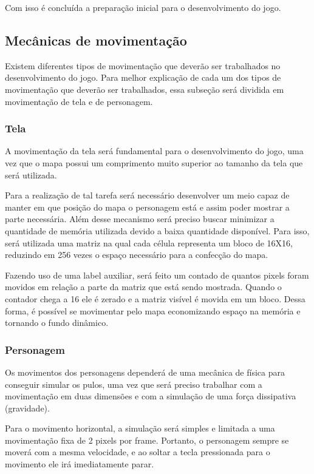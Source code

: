 \documentclass[11pt, twocolumn]{extarticle}
\begin{document}
Com isso é concluída a preparação inicial para o desenvolvimento do jogo.

\subsection{Mecânicas de movimentação}
\indent \indent Existem diferentes tipos de movimentação que deverão ser trabalhados no desenvolvimento do jogo. Para melhor explicação de cada um dos tipos de movimentação que deverão ser trabalhados, essa subseção será dividida em movimentação de tela e de personagem.

\subsubsection{Tela}
\indent \indent A movimentação da tela será fundamental para o desenvolvimento do jogo, uma vez que o mapa possui um comprimento muito superior ao tamanho da tela que será utilizada. 

Para a realização de tal tarefa será necessário desenvolver um meio capaz de manter em que posição do mapa o personagem está e assim poder mostrar a parte necessária. Além desse mecanismo será preciso buscar minimizar a quantidade de memória utilizada devido a baixa quantidade disponível. Para isso, será utilizada uma matriz na qual cada célula representa um bloco de 16X16, reduzindo em 256 vezes o espaço necessário para a confecção do mapa.

Fazendo uso de uma label auxiliar, será feito um contado de quantos pixels foram movidos em relação a parte da matriz que está sendo mostrada. Quando o contador chega a 16 ele é zerado e a matriz visível é movida em um bloco. Dessa forma, é possível se movimentar pelo mapa economizando espaço na memória e tornando o fundo dinâmico.


\subsubsection{Personagem}
\indent \indent Os movimentos dos personagens dependerá de uma mecânica de física para conseguir simular os pulos, uma vez que será preciso trabalhar com a movimentação em duas dimensões e com a simulação de uma força dissipativa (gravidade). 

Para o movimento horizontal, a simulação será simples e limitada a uma movimentação fixa de 2 pixels por frame. Portanto, o personagem sempre se moverá com a mesma velocidade, e ao soltar a tecla pressionada para o movimento ele irá imediatamente parar.
\end{document}
